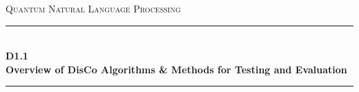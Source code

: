 \documentclass[11pt]{article}
\begin{document}
\begin{titlepage}
\newcommand{\HRule}{\rule{\linewidth}{0.1mm}} 
\center %
 
\textsc{\LARGE Quantum Natural Language Processing}\\[0.5cm] %
\vfill
\HRule \\[0.4cm]
{ \Large \bfseries D1.1} \\[0.2cm]
{ \Large \bfseries Overview of DisCo Algorithms \& Methods for Testing and Evaluation}\\[0.1cm]
\HRule \\[1.5cm]
 

\end{titlepage}
\end{document}
